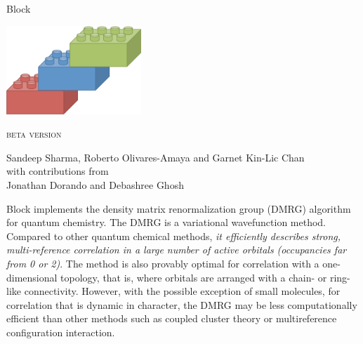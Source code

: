 \documentclass[letterpaper,12pt,aps, pra]{revtex4-1}
\begin{document}
\vfill
{\LARGE
  \begin{center}
{Block}
\end{center}
}
\vspace{0.5in}
\begin{center}{\includegraphics[width=2in]{block_logo}}\\
\end{center}
\vspace{0.5in}
\begin{center}
{\Large \textsc{beta version}}
\end{center}
\vspace{1in}

{\large
\begin{center}
Sandeep Sharma, Roberto Olivares-Amaya and Garnet Kin-Lic Chan\\
\vspace{0.2in}
with contributions from\\
\vspace{0.2in}
Jonathan Dorando and Debashree Ghosh
\end{center}
}
\vspace{1in}

\thispagestyle{empty}
\newpage

\tableofcontents
\newpage
{}

Block implements the density matrix renormalization group (DMRG) algorithm for quantum chemistry. 
The DMRG is a variational wavefunction method. Compared to other quantum chemical methods, 
{\it it  efficiently describes strong, multi-reference correlation in
 a large number of active orbitals (occupancies far from 0 or 2)}.
The method is also provably optimal for correlation with a one-dimensional topology, that is,
where orbitals are arranged with a chain- or ring-like connectivity.
However, with the possible exception of small molecules, for correlation that is dynamic in character, the DMRG may be less computationally
efficient than other methods such as coupled cluster theory or multireference configuration interaction.
\end{document}
